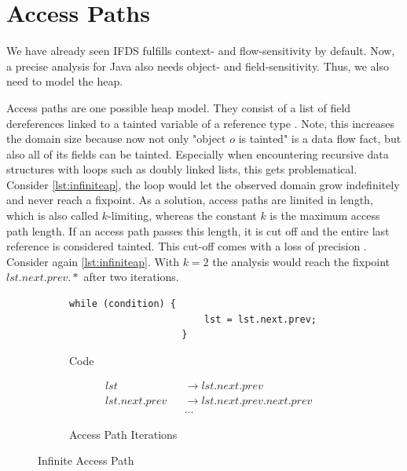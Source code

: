 \documentclass[../draft.tex]{subfiles}
\begin{document}
    \section{Access Paths}\label{s:ap}
    We have already seen IFDS fulfills context- and flow-sensitivity by default. 
    Now, a precise analysis for Java also needs object- and field-sensitivity. 
    Thus, we also need to model the heap. 

    Access paths are one possible heap model. 
    They consist of a list of field dereferences linked to a tainted variable of a reference type \cite{Khedker2009}. 
    Note, this increases the domain size because now not only "object $o$ is tainted" is a data flow fact, but also all of its fields can be tainted. 
    Especially when encountering recursive data structures with loops such as doubly linked lists, this gets problematical. 
    Consider \autoref{lst:infiniteap}, the loop would let the observed domain grow indefinitely and never reach a fixpoint.
    As a solution, access paths are limited in length, which is also called $k$-limiting, whereas the constant $k$ is the maximum access path length. 
    If an access path passes this length, it is cut off and the entire last reference is considered tainted.
    This cut-off comes with a loss of precision \cite{Jones1979}. 
    Consider again \autoref{lst:infiniteap}. 
    With $k=2$ the analysis would reach the fixpoint $lst.next.prev.*$ after two iterations.

    \begin{figure}[ht]
        \centering
        \begin{subfigure}[b]{0.45\textwidth}
            \centering
            \begin{adjustbox}{max width=\columnwidth}
                \begin{lstlisting}[gobble=20]
                    while (condition) {
                        lst = lst.next.prev;
                    }
                \end{lstlisting}
            \end{adjustbox}
            \caption{Code}
        \end{subfigure}
        \qquad
        \begin{subfigure}[b]{0.45\textwidth}
            \centering
            \small
            $$
            \begin{aligned}
                &lst& &\rightarrow lst.next.prev\\
                &lst.next.prev& &\rightarrow lst.next.prev.next.prev\\
                & & &...
            \end{aligned}
            $$
            \normalsize
            \caption{Access Path Iterations}
        \end{subfigure}
        \caption{Infinite Access Path}
        \label{lst:infiniteap}
    \end{figure}
\end{document}
